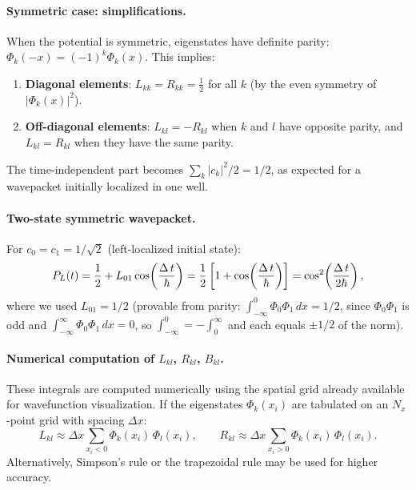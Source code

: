 \paragraph{Symmetric case: simplifications.}

When the potential is symmetric, eigenstates have definite parity: $\Phi_k(-x) = (-1)^k\Phi_k(x)$.
This implies:
\begin{enumerate}[label=(\roman*)]
  \item \textbf{Diagonal elements}: $L_{kk} = R_{kk} = \frac{1}{2}$ for all $k$ (by the even symmetry of $|\Phi_k(x)|^2$).
  \item \textbf{Off-diagonal elements}: $L_{kl} = -R_{kl}$ when $k$ and $l$ have opposite parity, and $L_{kl} = R_{kl}$ when they have the same parity.
\end{enumerate}
The time-independent part becomes $\sum_k|c_k|^2/2 = 1/2$, as expected for a wavepacket initially localized in one well.

\paragraph{Two-state symmetric wavepacket.}

For $c_0 = c_1 = 1/\sqrt{2}$ (left-localized initial state):
\begin{equation}
  P_L(t) = \frac{1}{2} + L_{01}\cos\!\left(\frac{\Delta\,t}{\hbar}\right)
  = \frac{1}{2}\left[1 + \cos\!\left(\frac{\Delta\,t}{\hbar}\right)\right]
  = \cos^2\!\left(\frac{\Delta\,t}{2\hbar}\right),
\end{equation}
where we used $L_{01} = 1/2$ (provable from parity: $\int_{-\infty}^{0}\Phi_0\Phi_1\,dx = 1/2$, since $\Phi_0\Phi_1$ is odd and $\int_{-\infty}^{\infty}\Phi_0\Phi_1\,dx = 0$, so $\int_{-\infty}^{0} = -\int_{0}^{\infty}$ and each equals $\pm 1/2$ of the norm).

\paragraph{Numerical computation of $L_{kl}$, $R_{kl}$, $B_{kl}$.}

These integrals are computed numerically using the spatial grid already available for wavefunction visualization.
If the eigenstates $\Phi_k(x_i)$ are tabulated on an $N_x$-point grid with spacing $\Delta x$:
\begin{equation}
  L_{kl} \approx \Delta x\sum_{x_i < 0} \Phi_k(x_i)\,\Phi_l(x_i),
  \qquad
  R_{kl} \approx \Delta x\sum_{x_i > 0} \Phi_k(x_i)\,\Phi_l(x_i).
\end{equation}
Alternatively, Simpson's rule or the trapezoidal rule may be used for higher accuracy.

